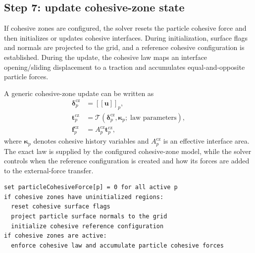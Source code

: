 \subsection{Step 7: update cohesive-zone state}
\label{subsec:solver-step-7}
If cohesive zones are configured, the solver resets the particle cohesive force and then initializes or updates cohesive interfaces.  During initialization, surface flags and normals are projected to the grid, and a reference cohesive configuration is established.  During the update, the cohesive law maps an interface opening/sliding displacement to a traction and accumulates equal-and-opposite particle forces.

A generic cohesive-zone update can be written as
\begin{align}
  \boldsymbol{\delta}_{p}^{\mathrm{cz}} &= \left[\!\left[\mathbf{u}\right]\!\right]_p, \\
  \mathbf{t}_{p}^{\mathrm{cz}} &= \mathcal{T}\!\left(\boldsymbol{\delta}_{p}^{\mathrm{cz}},\boldsymbol{\kappa}_p;\;\text{law parameters}\right), \\
  \mathbf{f}_{p}^{\mathrm{cz}} &= A_p^{\mathrm{cz}}\mathbf{t}_{p}^{\mathrm{cz}},
\end{align}
where $\boldsymbol{\kappa}_p$ denotes cohesive history variables and $A_p^{\mathrm{cz}}$ is an effective interface area.  The exact law is supplied by the configured cohesive-zone model, while the solver controls when the reference configuration is created and how its forces are added to the external-force transfer.

\begin{lstlisting}[caption={Cohesive-zone update.},basicstyle=\ttfamily\small]
set particleCohesiveForce[p] = 0 for all active p
if cohesive zones have uninitialized regions:
  reset cohesive surface flags
  project particle surface normals to the grid
  initialize cohesive reference configuration
if cohesive zones are active:
  enforce cohesive law and accumulate particle cohesive forces
\end{lstlisting}

